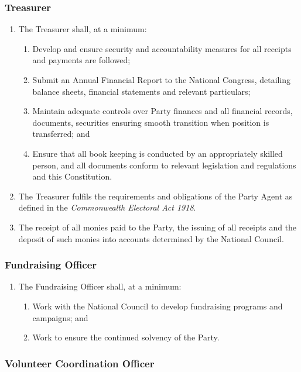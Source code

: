 \documentclass[a4paper,titlepage,8.5pt]{article}
\begin{document}
\subsubsection{Treasurer}

\begin{enumerate}
\item The Treasurer shall, at a minimum:
\begin{enumerate}
\item Develop and ensure security and accountability measures for all receipts and payments are followed;
\item Submit an Annual Financial Report to the National Congress, detailing balance sheets, financial statements and relevant particulars;
\item Maintain adequate controls over Party finances and all financial records, documents, securities ensuring smooth transition when position is transferred; and
\item Ensure that all book keeping is conducted by an appropriately skilled person, and all documents conform to relevant legislation and regulations and this Constitution.
\end{enumerate}
\item The Treasurer fulfils the requirements and obligations of the Party Agent as defined in the \textit{Commonwealth Electoral Act 1918}.
\item The receipt of all monies paid to the Party, the issuing of all receipts and the deposit of such monies into accounts determined by the National Council.
\end{enumerate}

\subsubsection{Fundraising Officer}

\begin{enumerate}
\item The Fundraising Officer shall, at a minimum:
\begin{enumerate}
\item Work with the National Council to develop fundraising programs and campaigns; and
\item Work to ensure the continued solvency of the Party.
\end{enumerate}
\end{enumerate}

\subsubsection{Volunteer Coordination Officer}
\end{document}
